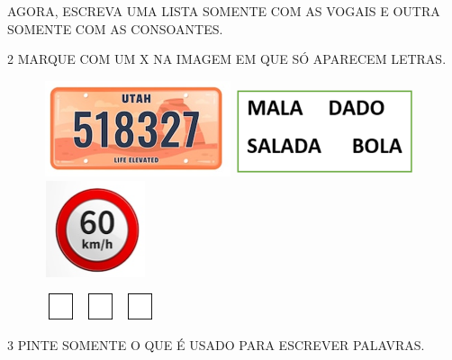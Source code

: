 \item AGORA, ESCREVA UMA LISTA SOMENTE COM AS VOGAIS E OUTRA SOMENTE COM AS CONSOANTES.



\num{2} MARQUE COM UM X NA IMAGEM EM QUE SÓ APARECEM LETRAS.

\begin{figure}[htpb!]
\includegraphics[width=2.18819in,height=1.11111in]{media/image2.png}
\includegraphics[width=2.03681in,height=1.04861in]{media/image3.png}
\includegraphics[width=1.20556in,height=1.11111in]{media/image4.png}

\hspace{2cm}\includegraphics[width=0.40972in,height=0.30069in]{media/image5.png}
\hspace{4.5cm}\includegraphics[width=0.40972in,height=0.30069in]{media/image5.png}
\hspace{3cm}\includegraphics[width=0.40972in,height=0.30069in]{media/image5.png}
\end{figure}

\num{3} PINTE SOMENTE O QUE É USADO PARA ESCREVER PALAVRAS.

